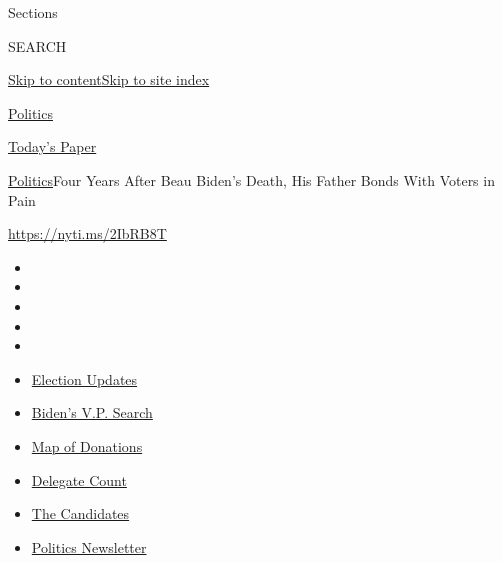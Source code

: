 Sections

SEARCH

\protect\hyperlink{site-content}{Skip to
content}\protect\hyperlink{site-index}{Skip to site index}

\href{https://www.nytimes.com/section/politics}{Politics}

\href{https://myaccount.nytimes.com/auth/login?response_type=cookie\&client_id=vi}{}

\href{https://www.nytimes.com/section/todayspaper}{Today's Paper}

\href{/section/politics}{Politics}\textbar{}Four Years After Beau
Biden's Death, His Father Bonds With Voters in Pain

\url{https://nyti.ms/2IbRB8T}

\begin{itemize}
\item
\item
\item
\item
\item
\end{itemize}

\begin{itemize}
\item
  \href{https://www.nytimes.com/2020/07/31/us/elections/biden-vs-trump.html?action=click\&pgtype=Article\&state=default\&region=TOP_BANNER\&context=storylines_menu}{Election
  Updates}
\item
  \href{https://www.nytimes.com/article/biden-vice-president-2020.html?action=click\&pgtype=Article\&state=default\&region=TOP_BANNER\&context=storylines_menu}{Biden's
  V.P. Search}
\item
  \href{https://www.nytimes.com/interactive/2020/07/24/us/politics/trump-biden-campaign-donors.html?action=click\&pgtype=Article\&state=default\&region=TOP_BANNER\&context=storylines_menu}{Map
  of Donations}
\item
  \href{https://www.nytimes.com/interactive/2020/us/elections/delegate-count-primary-results.html?action=click\&pgtype=Article\&state=default\&region=TOP_BANNER\&context=storylines_menu}{Delegate
  Count}
\item
  \href{https://www.nytimes.com/interactive/2019/us/politics/2020-presidential-candidates.html?action=click\&pgtype=Article\&state=default\&region=TOP_BANNER\&context=storylines_menu}{The
  Candidates}
\item
  \href{https://www.nytimes.com/newsletters/politics?action=click\&pgtype=Article\&state=default\&region=TOP_BANNER\&context=storylines_menu}{Politics
  Newsletter}
\end{itemize}


